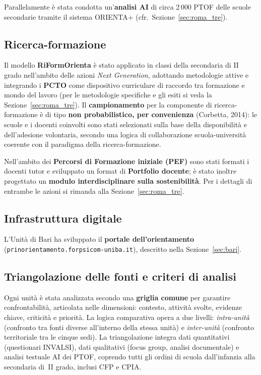 \documentclass[12pt,a4paper]{article}
\begin{document}
Parallelamente \`e stata condotta un'\textbf{analisi AI} di circa 2\,000 PTOF delle scuole secondarie tramite il sistema ORIENTA+ (cfr.\ Sezione~\ref{sec:roma_tre}).

\subsection{Ricerca-formazione}

Il modello \textbf{RiFormOrienta} \`e stato applicato in classi della secondaria di II grado nell'ambito delle azioni \textit{Next Generation}, adottando metodologie attive e integrando i \textbf{PCTO} come dispositivo curriculare di raccordo tra formazione e mondo del lavoro (per le metodologie specifiche e gli esiti si veda la Sezione~\ref{sec:roma_tre}). Il \textbf{campionamento} per la componente di ricerca-formazione \`e di tipo \textbf{non probabilistico, per convenienza} (Corbetta, 2014): le scuole e i docenti coinvolti sono stati selezionati sulla base della disponibilit\`a e dell'adesione volontaria, secondo una logica di collaborazione scuola-universit\`a coerente con il paradigma della ricerca-formazione.

Nell'ambito dei \textbf{Percorsi di Formazione iniziale (PEF)} sono stati formati i docenti tutor e sviluppato un format di \textbf{Portfolio docente}; \`e stato inoltre progettato un \textbf{modulo interdisciplinare sulla sostenibilit\`a}. Per i dettagli di entrambe le azioni si rimanda alla Sezione~\ref{sec:roma_tre}.

\subsection{Infrastruttura digitale}

L'Unit\`a di Bari ha sviluppato il \textbf{portale dell'orientamento} (\texttt{prinorientamento.forpsicom-uniba.it}), descritto nella Sezione~\ref{sec:bari}.

\subsection{Triangolazione delle fonti e criteri di analisi}

Ogni unit\`a \`e stata analizzata secondo una \textbf{griglia comune} per garantire confrontabilit\`a, articolata nelle dimensioni: contesto, attivit\`a svolte, evidenze chiave, criticit\`a e priorit\`a. La logica comparativa opera a due livelli: \textit{intra-unit\`a} (confronto tra fonti diverse all'interno della stessa unit\`a) e \textit{inter-unit\`a} (confronto territoriale tra le cinque sedi). La triangolazione integra dati quantitativi (questionari INVALSI), dati qualitativi (focus group, analisi documentale) e analisi testuale AI dei PTOF, coprendo tutti gli ordini di scuola dall'infanzia alla secondaria di~II grado, inclusi CFP e CPIA.
\end{document}
